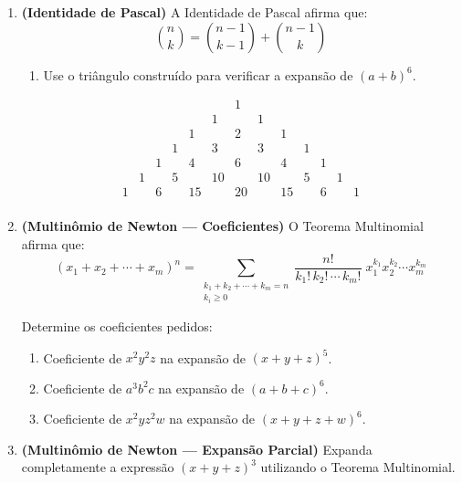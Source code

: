 \documentclass[12pt]{article}
\begin{document}
\begin{enumerate}
\item \textbf{(Identidade de Pascal)} A Identidade de Pascal afirma que:
\[
\binom{n}{k} = \binom{n-1}{k-1} + \binom{n-1}{k}
\]
\begin{enumerate}[label=\alph*)]
    \item Use o triângulo construído para verificar a expansão de $(a+b)^6$.
\end{enumerate}
\[
\begin{array}{ccccccccccccc}
&&&&&&1&&&&&& \\
&&&&&1&&1&&&&& \\
&&&&1&&2&&1&&&& \\
&&&1&&3&&3&&1&&& \\
&&1&&4&&6&&4&&1&& \\
&1&&5&&10&&10&&5&&1& \\
1&&6&&15&&20&&15&&6&&1 \\
\end{array}
\]
\vspace{0.2cm}
\begin{tcolorbox}[colback=white, colframe=maincolor, height=12cm, arc=2mm, boxrule=1pt]
\end{tcolorbox}

\item \textbf{(Multinômio de Newton — Coeficientes)} O Teorema Multinomial afirma que:
\[
(x_1 + x_2 + \cdots + x_m)^n = \sum_{\substack{k_1+k_2+\cdots+k_m = n\\k_i \geq 0}} \frac{n!}{k_1!\,k_2!\,\cdots\,k_m!}\; x_1^{k_1}x_2^{k_2}\cdots x_m^{k_m}
\]

Determine os coeficientes pedidos:
\begin{enumerate}[label=\alph*)]
    \item Coeficiente de $x^2 y^2 z$ na expansão de $(x + y + z)^5$.
    \item Coeficiente de $a^3 b^2 c$ na expansão de $(a + b + c)^6$.
    \item Coeficiente de $x^2 y z^2 w$ na expansão de $(x + y + z + w)^6$.
\end{enumerate}

\vspace{0.2cm}
\begin{tcolorbox}[colback=white, colframe=maincolor, height=8cm, arc=2mm, boxrule=1pt]
\end{tcolorbox}

\item \textbf{(Multinômio de Newton — Expansão Parcial)} Expanda completamente a expressão $(x + y + z)^3$ utilizando o Teorema Multinomial.


\end{enumerate}
\end{document}
